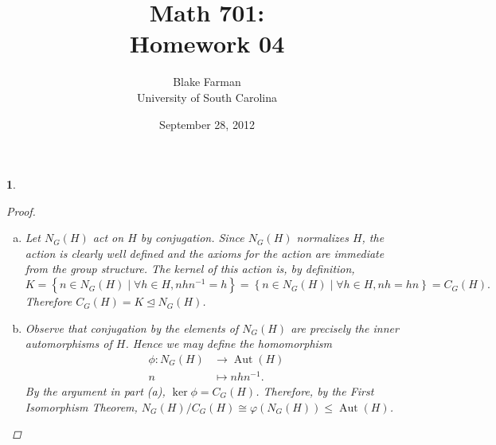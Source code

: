 \documentclass[10pt]{amsart}
\author{Blake Farman\\University of South Carolina}
\title{Math 701:\\Homework 04}
\date{September 28, 2012}
\begin{document}
\maketitle

\newcommand{\Inn}[1]{\operatorname{Inn}\left(#1\right)}
\newcommand{\Aut}[1]{\operatorname{Aut}\left(#1\right)}
\newcommand{\cntr}[1]{\mathbf{Z}\left(#1\right)}
\newcommand{\abs}[1]{\left| #1 \right|}
\newcommand{\SL}[2]{\operatorname{SL}_#1\left(#2\right)}
\newcommand{\Mat}[2]{\operatorname{Mat}_{#1}\left(#2\right)}
\newcommand{\orbit}[1]{\mathcal{O}_{#1}}
\renewcommand{\qedsymbol}{\ensuremath{\blacksquare}}

\newtheorem{thm}{}
\newtheorem{lem}{Lemma}

\begin{thm}
  \begin{proof}
    \begin{enumerate}[(a)]
      \item
        Let $N_G(H)$ act on $H$ by conjugation.
        Since $N_G(H)$ normalizes $H$, the action is clearly well defined and the axioms for the action are immediate from the group structure.
        The kernel of this action is, by definition, 
        $$K = \left\{n \in N_G(H) \mid \forall h \in H, nhn^{-1} = h\right\} = \left\{n \in N_G(H) \mid \forall h \in H, nh = hn\right\} = C_G(H).$$
        Therefore $C_G(H) = K \unlhd N_G(H)$.
      \item
        Observe that conjugation by the elements of $N_G(H)$ are precisely the inner automorphisms of $H$.
        Hence we may define the homomorphism
        \begin{align*}
          \phi \colon N_G(H) &\rightarrow \Aut{H}\\
          n &\mapsto nhn^{-1}.
        \end{align*}
        By the argument in part (a), $\ker\phi = C_G(H)$.
        Therefore, by the First Isomorphism Theorem, $N_G(H)/C_G(H) \cong \varphi(N_G(H)) \leq \Aut{H}$.
    \end{enumerate}
  \end{proof}
\end{thm}
\end{document}

